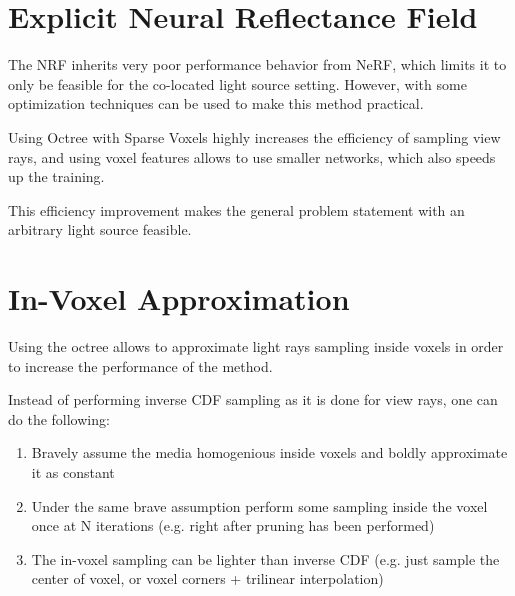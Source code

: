 \section{Explicit Neural Reflectance Field }

The NRF inherits very poor performance behavior from NeRF,
which limits it to only be feasible for the co-located light source setting.
However, with some optimization techniques \cite{NSVF, ...} can be used to make this method practical.

Using Octree with Sparse Voxels \cite{NSVF} highly increases the efficiency of sampling view rays,
and using voxel features allows to use smaller networks,
which also speeds up the training.

This efficiency improvement makes the general problem statement with an arbitrary light source feasible.


\section{In-Voxel Approximation}

Using the octree allows to approximate light rays sampling inside voxels in order to increase the performance of the method.

Instead of performing inverse CDF sampling as it is done for view rays, one can do the following:
\begin{enumerate}
    \item Bravely  assume the media homogenious inside voxels and boldly approximate it as constant
    \item Under the same brave assumption perform some sampling inside the voxel once at N iterations (e.g. right after pruning has been performed)
    \item The in-voxel sampling can be lighter than inverse CDF (e.g. just sample the center of voxel, or voxel corners + trilinear interpolation)
\end{enumerate}











